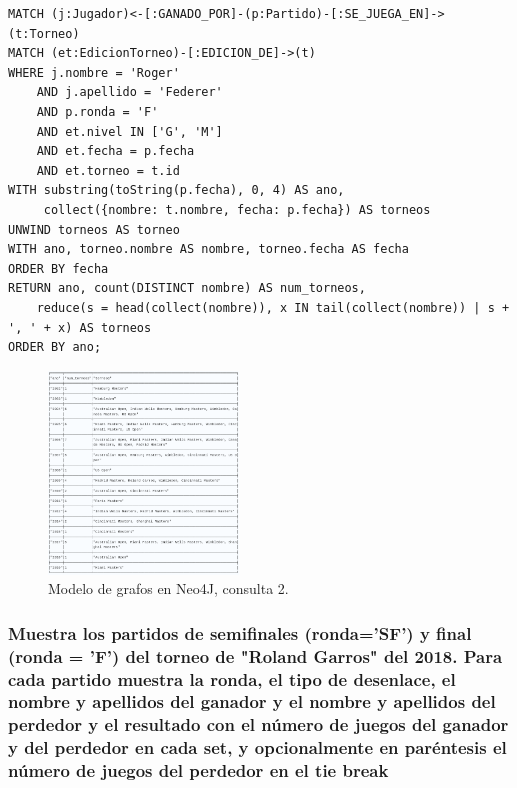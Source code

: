 \begin{verbatim}
MATCH (j:Jugador)<-[:GANADO_POR]-(p:Partido)-[:SE_JUEGA_EN]->(t:Torneo)
MATCH (et:EdicionTorneo)-[:EDICION_DE]->(t)
WHERE j.nombre = 'Roger'
    AND j.apellido = 'Federer'
    AND p.ronda = 'F'
    AND et.nivel IN ['G', 'M']
    AND et.fecha = p.fecha
    AND et.torneo = t.id
WITH substring(toString(p.fecha), 0, 4) AS ano, 
     collect({nombre: t.nombre, fecha: p.fecha}) AS torneos
UNWIND torneos AS torneo
WITH ano, torneo.nombre AS nombre, torneo.fecha AS fecha
ORDER BY fecha
RETURN ano, count(DISTINCT nombre) AS num_torneos, 
    reduce(s = head(collect(nombre)), x IN tail(collect(nombre)) | s + ', ' + x) AS torneos
ORDER BY ano;
\end{verbatim}

\begin{figure}[H]
\centering
\includegraphics[width=0.45\textwidth]{fotos/q2_neo.png}
\caption{Modelo de grafos en Neo4J, consulta 2.}
\label{fig:q2_neo}
\end{figure}



\subsubsection{Muestra los partidos de semiﬁnales (ronda='SF') y ﬁnal (ronda = 'F') del torneo de "Roland Garros" del 2018. Para cada partido muestra la ronda, el tipo de desenlace, el nombre y apellidos del ganador y el nombre y apellidos del perdedor y el resultado con el número de juegos del ganador y del perdedor en cada set, y opcionalmente en paréntesis el número de juegos del perdedor en el tie break}

